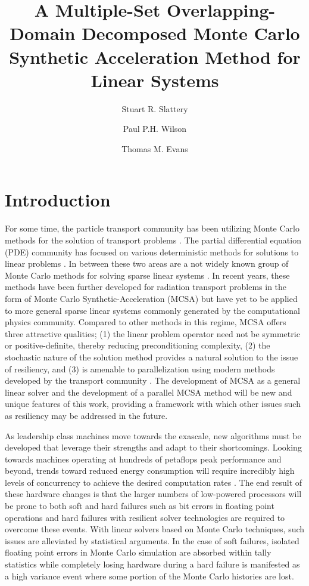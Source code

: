 \documentclass{snamc2013}
\title{A Multiple-Set Overlapping-Domain Decomposed Monte Carlo
  Synthetic Acceleration Method for Linear Systems}
\author[1]{Stuart R. Slattery}
\author[1]{Paul P.H. Wilson}
\author[2]{Thomas M. Evans}
\affil[1]{University of Wisconsin - Madison, Engineering Physics
  Department, 1500 Engineering Drive, Madison, WI 53706}
\affil[2]{Oak Ridge National Laboratory, One Bethel Valley Road, Oak
  Ridge, TN 37830}
\begin{document}
\section{Introduction}

For some time, the particle transport community has been utilizing
Monte Carlo methods for the solution of transport problems
\cite{lewis_computational_1993}. The partial differential equation
(PDE) community has focused on various deterministic methods for
solutions to linear problems \cite{saad_iterative_2003}. In between
these two areas are a not widely known group of Monte Carlo methods
for solving sparse linear systems \cite{forsythe_matrix_1950,
  hammersley_monte_1964, halton_sequential_1962,
  halton_sequential_1994}. In recent years, these methods have been
further developed for radiation transport problems in the form of
Monte Carlo Synthetic-Acceleration (MCSA) \cite{evans_monte_2009,
  evans_monte_2012} but have yet to be applied to more general sparse
linear systems commonly generated by the computational physics
community. Compared to other methods in this regime, MCSA offers three
attractive qualities; (1) the linear problem operator need not be
symmetric or positive-definite, thereby reducing preconditioning
complexity, (2) the stochastic nature of the solution method provides
a natural solution to the issue of resiliency, and (3) is amenable to
parallelization using modern methods developed by the transport
community \cite{wagner_hybrid_2010}. The development of MCSA as a
general linear solver and the development of a parallel MCSA method
will be new and unique features of this work, providing a framework
with which other issues such as resiliency may be addressed in the
future.

As leadership class machines move towards the exascale, new algorithms
must be developed that leverage their strengths and adapt to their
shortcomings. Looking towards machines operating at hundreds of
petaflops peak performance and beyond, trends toward reduced energy
consumption will require incredibly high levels of concurrency to
achieve the desired computation rates \cite{kogge_using_2011}. The end
result of these hardware changes is that the larger numbers of
low-powered processors will be prone to both soft and hard failures
such as bit errors in floating point operations and hard failures with
resilient solver technologies are required to overcome these
events. With linear solvers based on Monte Carlo techniques, such
issues are alleviated by statistical arguments. In the case of soft
failures, isolated floating point errors in Monte Carlo simulation are
absorbed within tally statistics while completely losing hardware
during a hard failure is manifested as a high variance event where
some portion of the Monte Carlo histories are lost.
\end{document}
